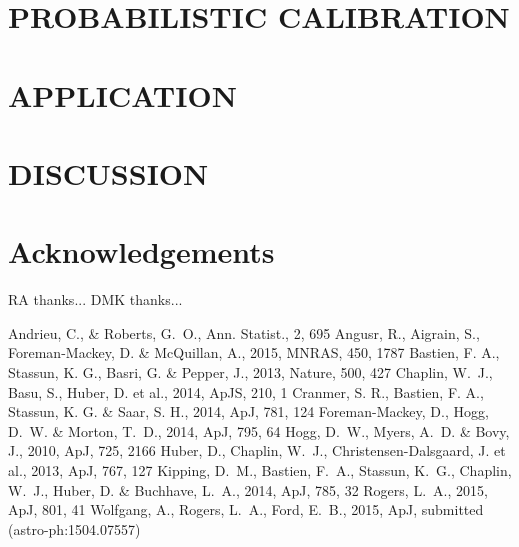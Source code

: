\documentclass[apjl]{emulateapj}
\begin{document}
\section{PROBABILISTIC CALIBRATION}
\label{sec:HBM}



\section{APPLICATION}
\label{sec:appication}



\section{DISCUSSION}
\label{sec:discussion}



\acknowledgements
\section*{Acknowledgements}

RA thanks...
DMK thanks...


\begin{thebibliography}{99}
Andrieu, C., \& Roberts, G.~O., Ann. Statist., 2, 695
Angusr, R., Aigrain, S., Foreman-Mackey, D. \& McQuillan, A., 2015, MNRAS,
450, 1787
 Bastien,
F. A., Stassun, K. G., Basri, G. \& Pepper, J., 2013, Nature, 500, 427
Chaplin, W.~J., Basu, S., Huber, D. et al., 2014, ApJS, 210, 1
Cranmer, S. R., Bastien, F. A., Stassun, K. G. \& Saar, S. H., 2014, ApJ, 781,
124
 Foreman-Mackey, D., Hogg, D.~W. \& Morton, T.~D., 2014,
ApJ, 795, 64
Hogg, D.~W., Myers, A.~D. \& Bovy, J., 2010, ApJ, 725,
2166
Huber, D., Chaplin, W.~J., Christensen-Dalsgaard, J. et al., 2013, ApJ, 767,
127
Kipping, D.~M., Bastien, F.~A., Stassun, K.~G., Chaplin, W.~J., Huber, D. \&
Buchhave, L.~A., 2014, ApJ, 785, 32
Rogers, L.~A., 2015, ApJ, 801, 41
Wolfgang, A., Rogers, L.~A., Ford, E.~B., 2015, ApJ, submitted
(astro-ph:1504.07557)
\end{thebibliography}
\end{document}
